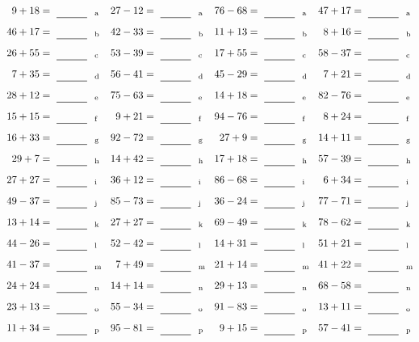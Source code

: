\documentclass
[
  draft    = true,
  fontsize = 11pt,
  parskip  = half-
]
{scrartcl}
\begin{document}
\clearpage
\begin{align*}
    \pline{9+18}&=\rline{a}
  & \pline{27-12}&=\rline{a}
  & \pline{76-68}&=\rline{a}
  & \pline{47+17}&=\rline{a} \\[1ex]
    \pline{46+17}&=\rline{b}
  & \pline{42-33}&=\rline{b}
  & \pline{11+13}&=\rline{b}
  & \pline{8+16}&=\rline{b} \\[1ex]
    \pline{26+55}&=\rline{c}
  & \pline{53-39}&=\rline{c}
  & \pline{17+55}&=\rline{c}
  & \pline{58-37}&=\rline{c} \\[1ex]
    \pline{7+35}&=\rline{d}
  & \pline{56-41}&=\rline{d}
  & \pline{45-29}&=\rline{d}
  & \pline{7+21}&=\rline{d} \\[1ex]
    \pline{28+12}&=\rline{e}
  & \pline{75-63}&=\rline{e}
  & \pline{14+18}&=\rline{e}
  & \pline{82-76}&=\rline{e} \\[1ex]
    \pline{15+15}&=\rline{f}
  & \pline{9+21}&=\rline{f}
  & \pline{94-76}&=\rline{f}
  & \pline{8+24}&=\rline{f} \\[1ex]
    \pline{16+33}&=\rline{g}
  & \pline{92-72}&=\rline{g}
  & \pline{27+9}&=\rline{g}
  & \pline{14+11}&=\rline{g} \\[1ex]
    \pline{29+7}&=\rline{h}
  & \pline{14+42}&=\rline{h}
  & \pline{17+18}&=\rline{h}
  & \pline{57-39}&=\rline{h} \\[1ex]
    \pline{27+27}&=\rline{i}
  & \pline{36+12}&=\rline{i}
  & \pline{86-68}&=\rline{i}
  & \pline{6+34}&=\rline{i} \\[1ex]
    \pline{49-37}&=\rline{j}
  & \pline{85-73}&=\rline{j}
  & \pline{36-24}&=\rline{j}
  & \pline{77-71}&=\rline{j} \\[1ex]
    \pline{13+14}&=\rline{k}
  & \pline{27+27}&=\rline{k}
  & \pline{69-49}&=\rline{k}
  & \pline{78-62}&=\rline{k} \\[1ex]
    \pline{44-26}&=\rline{l}
  & \pline{52-42}&=\rline{l}
  & \pline{14+31}&=\rline{l}
  & \pline{51+21}&=\rline{l} \\[1ex]
    \pline{41-37}&=\rline{m}
  & \pline{7+49}&=\rline{m}
  & \pline{21+14}&=\rline{m}
  & \pline{41+22}&=\rline{m} \\[1ex]
    \pline{24+24}&=\rline{n}
  & \pline{14+14}&=\rline{n}
  & \pline{29+13}&=\rline{n}
  & \pline{68-58}&=\rline{n} \\[1ex]
    \pline{23+13}&=\rline{o}
  & \pline{55-34}&=\rline{o}
  & \pline{91-83}&=\rline{o}
  & \pline{13+11}&=\rline{o} \\[1ex]
    \pline{11+34}&=\rline{p}
  & \pline{95-81}&=\rline{p}
  & \pline{9+15}&=\rline{p}
  & \pline{57-41}&=\rline{p}
\end{align*}
\end{document}

